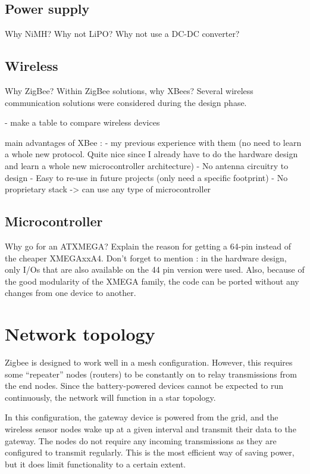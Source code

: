 \subsection{Power supply}
Why NiMH? Why not LiPO? Why not use a DC-DC converter?

\subsection{Wireless}
Why ZigBee? Within ZigBee solutions, why XBees?
Several wireless communication solutions were considered during the design
phase. 

- make a table to compare wireless devices

main advantages of XBee : 
- my previous experience with them (no need to learn a
  whole new protocol. Quite nice since I already have to do the hardware design
  and learn a whole new microcontroller architecture)
- No antenna circuitry to design
- Easy to re-use in future projects (only need a specific footprint)
- No proprietary stack -> can use any type of microcontroller

\subsection{Microcontroller}
Why go for an ATXMEGA?
Explain the reason for getting a 64-pin instead of the cheaper XMEGAxxA4.
Don't forget to mention : in the hardware design, only I/Os that are also
available on the 44 pin version were used. Also, because of the good modularity
of the XMEGA family, the code can be ported without any changes from one device
to another.


\section{Network topology}

Zigbee is designed to work well in a mesh configuration. However, this requires
some ``repeater'' nodes (routers) to be constantly on to relay transmissions
from the end nodes. Since the battery-powered devices cannot be expected to run
continuously, the network will function in a star topology.

In this configuration, the gateway device is powered from the grid, and the
wireless sensor nodes wake up at a given interval and transmit their data to the
gateway. The nodes do not require any incoming transmissions as they are
configured to transmit regularly. This is the most efficient way of saving
power, but it does limit functionality to a certain extent.

